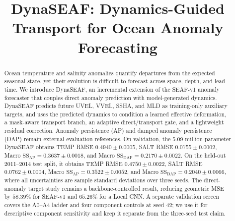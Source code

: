 \documentclass[conference]{IEEEtran}
\begin{document}
\raggedbottom

\title{DynaSEAF: Dynamics-Guided Transport for Ocean Anomaly Forecasting}

\author{
}

\maketitle

\begin{abstract}
Ocean temperature and salinity anomalies quantify departures from the expected seasonal state, yet their evolution is difficult to forecast across space, depth, and lead time. We introduce DynaSEAF, an incremental extension of the SEAF-v1 anomaly forecaster that couples direct anomaly prediction with model-generated dynamics. DynaSEAF predicts future UVEL, VVEL, SSHA, and MLD as training-only auxiliary targets, and uses the predicted dynamics to condition a learned effective deformation, a mask-aware transport branch, an adaptive direct/transport gate, and a lightweight residual correction. Anomaly persistence (AP) and damped anomaly persistence (DAP) remain external evaluation references. On validation, the 5.09-million-parameter DynaSEAF obtains TEMP RMSE $0.4940\pm0.0005$, SALT RMSE $0.0755\pm0.0002$, Macro $\mathrm{SS}_{\mathrm{AP}}=0.3637\pm0.0018$, and Macro $\mathrm{SS}_{\mathrm{DAP}}=0.2170\pm0.0022$. On the held-out 2011--2014 test split, it obtains TEMP RMSE $0.4750\pm0.0022$, SALT RMSE $0.0762\pm0.0004$, Macro $\mathrm{SS}_{\mathrm{AP}}=0.3522\pm0.0052$, and Macro $\mathrm{SS}_{\mathrm{DAP}}=0.2040\pm0.0066$, where all uncertainties are sample standard deviations over three seeds. The direct-anomaly target study remains a backbone-controlled result, reducing geometric MSE by $58.39\%$ for SEAF-v1 and $65.26\%$ for a Local CNN. A separate validation screen covers the A0--A4 ladder and four component controls at seed 42; we use it for descriptive component sensitivity and keep it separate from the three-seed test claim.
\end{abstract}
\end{document}
